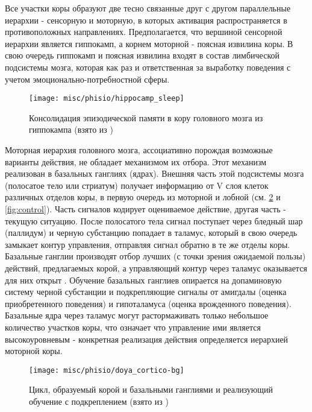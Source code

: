 \documentclass[12pt]{report}
\begin{document}
	Все участки коры образуют две тесно связанные друг с другом параллельные иерархии - сенсорную и моторную, в которых активация распространяется в противоположных направлениях. Предполагается, что вершиной сенсорной иерархии является гиппокамп, а корнем моторной - поясная извилина коры. В свою очередь гиппокамп и поясная извилина входят в состав лимбической подсистемы мозга, которая как раз и ответственная за выработку поведения с учетом эмоционально-потребностной сферы.

	\begin{figure}
		\centering
		\texttt{[image: misc/phisio/hippocamp\_sleep]}
		\caption{Консолидация эпизодической памяти в кору головного мозга из гиппокампа (взято из \cite{Saletin2012})}
		\label{fig:hippocamp}		
	\end{figure}	

	
	Моторная иерархия головного мозга, ассоциативно порождая возможные варианты действия, не обладает механизмом их отбора. Этот механизм реализован в базальных ганглиях (ядрах). Внешняя часть этой подсистемы мозга (полосатое тело или стриатум) получает информацию от V слоя клеток различных отделов коры, в первую очередь из моторной и лобной (см. \ref{fig:doy_cortbga} и \ref{fig:control}). Часть сигналов кодирует оцениваемое действие, другая часть - текущую ситуацию. После полосатого тела сигнал поступает через бледный шар (паллидум) и черную субстанцию попадает в таламус, который в свою очередь замыкает контур управления, отправляя сигнал обратно в те же отделы коры. Базальные ганглии производят отбор лучших (с точки зрения ожидаемой пользы) действий, предлагаемых корой, а управляющий контур через таламус оказывается для них открыт \cite{Gurney2001}. Обучение базальных ганглиев опирается на допаминовую систему черной субстанции и подкрепляющие сигналы от амигдалы (оценка приобретенного поведения) и гипоталамуса (оценка врожденного поведения). Базальные ядра через таламус могут растормаживать только небольшое количество участков коры, что означает что управление ими является высокоуровневым - конкретная реализация действия определяется иерархией моторной коры.

	\begin{figure}
		\centering
		\texttt{[image: misc/phisio/doya\_cortico-bg]}
		\caption{Цикл, образуемый корой и базальными ганглиями и реализующий обучение с подкреплением (взято из \cite{Doya2000a})}
		\label{fig:doy_cortbga}		
	\end{figure}
\end{document}
